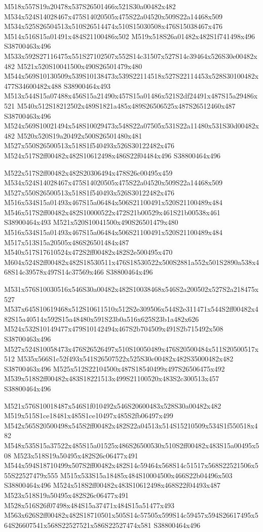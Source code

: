 \documentclass{article}
\begin{document}
\begin{multicols}{2}
M518x557S19a20478x537S26501466x521S30a00482x482 M534x524S14028467x475S14020505x475S22a04520x509S22a14468x509 M534x525S26504513x510S26514474x510S15030508x476S15038467x476 M514x516S15a01491x484S21100486x502 M519x518S26a01482x482S1f741498x496 S38700463x496 M533x592S27116475x551S27102507x552S14c31507x527S14c39464x526S30e00482x482 M521x520S10041500x490S26501479x480 M544x569S10130509x539S10138473x539S22114518x527S22114453x528S30100482x477S34600482x488 S38900464x493 M513x544S15a07488x456S15a21490x457S15a01486x521S2df24491x487S15a29486x521 M540x512S18212502x489S1821a485x489S26506525x487S26512460x487 S38700463x496 M524x569S10021494x548S10029473x548S22a07505x531S22a11480x531S30d00482x482 M520x520S19a20492x500S26501480x481 M527x550S26500513x518S1f540493x526S30122482x476 M524x517S2ff00482x482S10612498x486S22f04484x496 S38800464x496

M522x517S2ff00482x482S20306494x478S26c00495x459 M534x524S14028467x475S14020505x475S22a04520x509S22a14468x509 M527x550S26500513x518S1f540493x526S30122482x476 M516x534S15a01493x467S15a06484x506S21100491x520S21100489x484 M546x517S2ff00482x482S10000522x472S21b00529x461S21b00538x461 S38900464x493 M521x520S10041500x490S26501479x480 M516x534S15a01493x467S15a06484x506S21100491x520S21100489x484 M517x513S15a20505x486S26501484x487 M540x517S17610524x472S2ff00482x482S2e500495x470 M604x524S2ff00482x482S18530511x476S18530522x500S2881a552x501S2890a538x468S14c39578x497S14c37569x466 S38800464x496

M531x576S10030516x546S30a00482x482S10038468x546S2a200502x527S2a218475x527 M537x645S10619468x512S10611510x512S2e309506x544S2e311471x544S2ff00482x482S15a40514x592S15a48480x591S23b0a516x625S23b1a482x626 M524x532S10149477x479S10142494x467S2b704509x491S2b715492x508 S38700463x496 M527x524S10058473x476S26526497x510S10050489x476S20500484x511S20500517x512 M535x566S1c52f493x541S26507522x525S30c00482x482S35000482x482 S38700463x496 M525x512S22104500x487S18540499x497S26506475x492 M539x518S2ff00482x483S18221513x499S21100520x483S2c300513x457 S38800464x496

M521x576S10018487x546S1f010492x546S20600483x528S30a00482x482 M519x515S1ce18481x485S1ce10497x485S2fb06497x499 M542x565S20500498x545S2ff00482x482S22a04513x514S15210509x534S1f550518x482 M548x535S15a37522x485S15a01525x486S26500530x510S2ff00482x483S15a00495x508 M523x518S19a50495x482S26c06477x491 M544x594S18710499x507S2ff00482x482S14c59464x568S14c51517x568S22521506x555S22527479x555 M515x533S15a18485x484S10004500x466S22b04496x503 S38800464x496 M524x518S2ff00482x483S10612498x468S22f04493x487 M523x518S19a50495x482S26c06477x491 M528x516S26f07498x484S15a37471x484S15a51477x493 M563x626S2ff00482x482S18710501x505S14c57505x599S14c59457x594S26617495x564S26607541x568S22527521x586S22527474x581 S38800464x496


\end{multicols}
\end{document}
